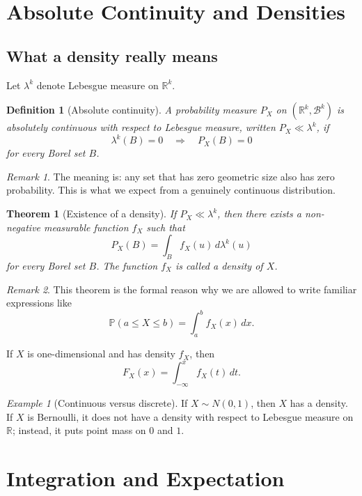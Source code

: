 \documentclass[11pt]{article}
\newtheorem{definition}{Definition}[section]
\newtheorem{theorem}{Theorem}[section]
\theoremstyle{remark}
\newtheorem{remark}{Remark}[section]
\newtheorem{example}{Example}[section]
\newcommand{\R}{\mathbb{R}}
\newcommand{\PP}{\mathbb{P}}
\newcommand{\1}{\mathbbm{1}}
\newcommand{\cB}{\mathcal{B}}
\begin{document}
\section{Absolute Continuity and Densities}

\subsection{What a density really means}

Let \(\lambda^k\) denote Lebesgue measure on \(\R^k\).

\begin{definition}[Absolute continuity]
A probability measure \(P_X\) on \((\R^k,\cB^k)\) is \emph{absolutely continuous} with respect to Lebesgue measure, written \(P_X \ll \lambda^k\), if
\[
  \lambda^k(B)=0 \quad \Rightarrow \quad P_X(B)=0
\]
for every Borel set \(B\).
\end{definition}

\begin{remark}
The meaning is: any set that has zero geometric size also has zero probability. This is what we expect from a genuinely continuous distribution.
\end{remark}

\begin{theorem}[Existence of a density]
If \(P_X \ll \lambda^k\), then there exists a non-negative measurable function \(f_X\) such that
\[
  P_X(B)=\int_B f_X(u)\,d\lambda^k(u)
\]
for every Borel set \(B\). The function \(f_X\) is called a \emph{density} of \(X\).
\end{theorem}

\begin{remark}
This theorem is the formal reason why we are allowed to write familiar expressions like
\[
  \PP(a \le X \le b)=\int_a^b f_X(x)\,dx.
\]
\end{remark}

If \(X\) is one-dimensional and has density \(f_X\), then
\[
  F_X(x)=\int_{-\infty}^x f_X(t)\,dt.
\]

\begin{example}[Continuous versus discrete]
If \(X \sim N(0,1)\), then \(X\) has a density. If \(X\) is Bernoulli, it does not have a density with respect to Lebesgue measure on \(\R\); instead, it puts point mass on \(0\) and \(1\).
\end{example}

\section{Integration and Expectation}
\end{document}
